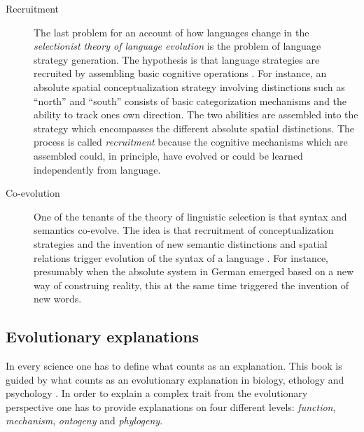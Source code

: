 \begin{description}
\item[Recruitment]
The last problem for an account of how languages change in the 
\emph{selectionist theory of language evolution} is the problem of language strategy
generation. The hypothesis is that language strategies are recruited by assembling
basic cognitive operations \citep{steels2007recruitment}. For instance, an 
absolute spatial conceptualization strategy
involving distinctions such as ``north'' and ``south''  consists of basic categorization
mechanisms and the ability to track ones own direction. The two abilities are assembled
into the strategy which encompasses the different absolute spatial distinctions.
The process is called \emph{recruitment} because the cognitive mechanisms which
are assembled could, in principle, have evolved or could be learned independently 
from language. 

\item[Co-evolution] 
One of the tenants of the theory of linguistic selection is that syntax and semantics co-evolve. 
The idea is that recruitment of conceptualization strategies and the invention of new
semantic distinctions and spatial relations trigger evolution of the syntax of a language
\citep{steels1997distinctions,steels1998synthesizing}.  
For instance, presumably when the absolute system in German emerged based
on a new way of construing reality, this at the same time triggered 
the invention of new words. 
\end{description}

\subsection{Evolutionary explanations}
In every science one has to define what counts as an explanation. 
This book is guided by what counts as an evolutionary explanation
in biology, ethology and psychology \citep{tinbergen1963aims,dunbar1998theory}. 
In order to explain a complex trait from the evolutionary perspective 
one has to provide explanations on four different levels: \emph{function}, 
\emph{mechanism}, \emph{ontogeny} and \emph{phylogeny}.

